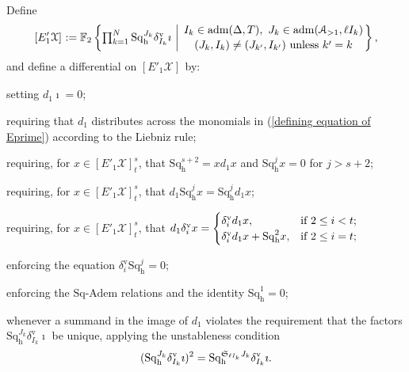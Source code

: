 \documentclass[11pt]{amsart} \renewcommand{\baselinestretch}{1.2}
\theoremstyle{plain}
\theoremstyle{definition}
\newcommand{\calA}{\mathcal{A}}
\newcommand{\calx}{\mathcal{X}}
\newcommand{\Sq}{\mathrm{Sq}}
\newcommand{\LieSteen}{\calA}
\newcommand{\aDTnoplus}{\mathrm{adm}(\Delta,T)}
\newcommand{\aS}[1]{\mathrm{adm}(\LieSteen_{>1},#1)}
\newcommand{\F}{\mathbb{F}}
\newcommand{\Ftwo}{\F_2}
\newcommand{\STOP}{\mathfrak{S}}
\newcommand{\Eprime}[5]{[E'_{#2}#3]^{#4}_{#5}}
\newcommand{\uver}{^\mathrm{v}}
\newcommand{\dhor}{_\mathrm{h}}
\newcommand{\Sqh}{\mathrm{Sq}\dhor}
\newcommand{\deltav}{\delta\uver}
\begin{document}
\begin{Calculations of HWn}
Define
\begin{equation}\label{defining equation of Eprime}
\Eprime{blank}{1}{\calx}{}{}:=
\Ftwo\left\{\textstyle\prod_{k=1}^N\Sq\dhor^{J_k}\deltav_{I_k}\imath\ \middle|\ 
\genfrac{}{}{0pt}{}{I_k\in \aDTnoplus,\ J_k\in \aS{\ell I_k}}{(J_k,I_k)\neq (J_{k'},I_{k'})\textup{ unless }k'=k}
\right\},
\end{equation}
and define a differential on $\Eprime{blank}{1}{\calx}{}{}$ by:
\setcounter{keepeqno}{\value{equation}}%
  \begin{list}{(\theequation)}{}%
  \setcounter{equation}{\value{keepeqno}}
\item \label{ITM1} setting $d_1\imath=0$;
\item \label{ITM2} requiring that $d_1$ distributes across the monomials in (\ref{defining equation of Eprime}) according to the Liebniz rule;
\item \label{ITM2.5} %
requiring, for $x\in \Eprime{blank}{1}{\calx}{s}{t}$, that $\Sqh^{s+2}=xd_1x$ and $\Sqh^jx=0$ for $j>s+2$;
\item \label{ITM3} requiring, for $x\in \Eprime{blank}{1}{\calx}{s}{t}$, that $d_1\Sqh^jx = \Sqh^jd_1x$;
\item \label{ITM4}
requiring, for $x\in \Eprime{blank}{1}{\calx}{s}{t}$, that $d_1\deltav_ix=
\begin{cases}
\deltav_id_1x,&\textup{if $2\leq i < t$};\\
\deltav_id_1x + \Sqh^2 x,&\textup{if $2\leq i = t$};
\end{cases}$
\item \label{ITM5} enforcing the equation $\deltav_i\Sqh^j=0$;
\item \label{ITM6} enforcing the $\Sq$-Adem relations and the identity $\Sqh^1=0$;
\item \label{ITM7} 
whenever a summand in the image of $d_1$ violates the requirement that the factors $\Sqh^{J_k}\deltav_{I_k}\imath$ be unique, applying the unstableness condition
\[(\Sqh^{J_k}\deltav_{I_k}\imath)^{2}=\Sqh^{\smash{\STOP_{\ell I_k}J_k}}\deltav_{I_k}\imath.\]
\end{list}

\end{Calculations of HWn}
\end{document}
